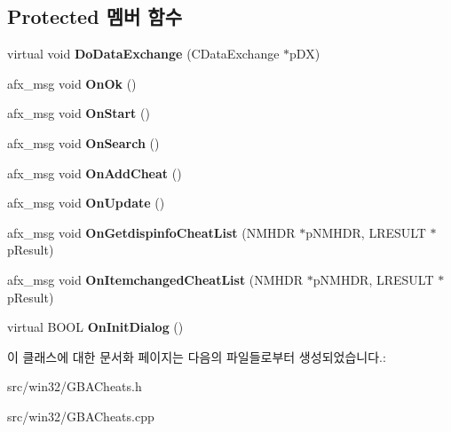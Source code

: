 \subsection*{Protected 멤버 함수}
\begin{DoxyCompactItemize}
\item 
\mbox{\label{class_g_b_a_cheat_search_aa72724b88600ea8391dba6f6cf085282}} 
virtual void {\bfseries Do\+Data\+Exchange} (C\+Data\+Exchange $\ast$p\+DX)
\item 
\mbox{\label{class_g_b_a_cheat_search_a6e17bbbf43d2a744853abfb00fa791ec}} 
afx\+\_\+msg void {\bfseries On\+Ok} ()
\item 
\mbox{\label{class_g_b_a_cheat_search_a7c1882cbc31a995d42b02017af188353}} 
afx\+\_\+msg void {\bfseries On\+Start} ()
\item 
\mbox{\label{class_g_b_a_cheat_search_a2b933c2b548983257f7e92da9bbb1695}} 
afx\+\_\+msg void {\bfseries On\+Search} ()
\item 
\mbox{\label{class_g_b_a_cheat_search_ae1797b0166163a717a3f3dfa873c13e6}} 
afx\+\_\+msg void {\bfseries On\+Add\+Cheat} ()
\item 
\mbox{\label{class_g_b_a_cheat_search_ac38fa782e7bb20f90f40e6605808f9fe}} 
afx\+\_\+msg void {\bfseries On\+Update} ()
\item 
\mbox{\label{class_g_b_a_cheat_search_a6ad35822df234eb7d2db23435381577e}} 
afx\+\_\+msg void {\bfseries On\+Getdispinfo\+Cheat\+List} (N\+M\+H\+DR $\ast$p\+N\+M\+H\+DR, L\+R\+E\+S\+U\+LT $\ast$p\+Result)
\item 
\mbox{\label{class_g_b_a_cheat_search_aa46092b07e72e992913262bc29546b2a}} 
afx\+\_\+msg void {\bfseries On\+Itemchanged\+Cheat\+List} (N\+M\+H\+DR $\ast$p\+N\+M\+H\+DR, L\+R\+E\+S\+U\+LT $\ast$p\+Result)
\item 
\mbox{\label{class_g_b_a_cheat_search_a29ff71ddc116276ad183d91e93d69426}} 
virtual B\+O\+OL {\bfseries On\+Init\+Dialog} ()
\end{DoxyCompactItemize}


이 클래스에 대한 문서화 페이지는 다음의 파일들로부터 생성되었습니다.\+:\begin{DoxyCompactItemize}
\item 
src/win32/G\+B\+A\+Cheats.\+h\item 
src/win32/G\+B\+A\+Cheats.\+cpp\end{DoxyCompactItemize}

